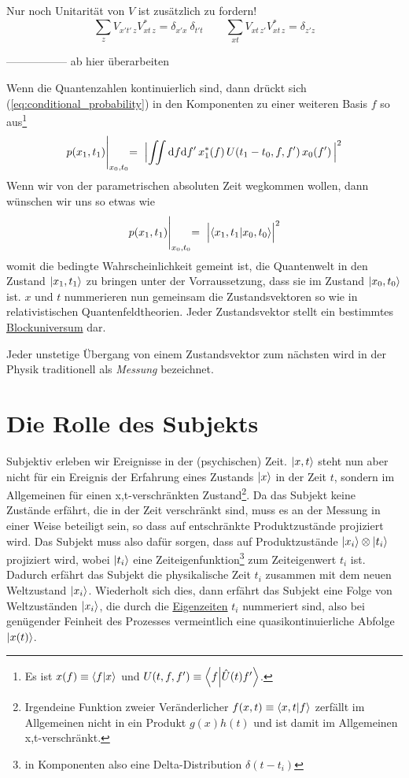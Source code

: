 \documentclass[12pt]{article}
\begin{document}
Nur noch Unitarität von $V$ ist zusätzlich zu fordern!
\begin{equation} 
\sum_{z} V_{x't'\, z} V^*_{xt\, z} = \delta_{x'x}\ \delta_{t't} \quad\quad
\sum_{xt} V_{xt\, z'} V^*_{xt\, z} = \delta_{z'z}
\end{equation}


-----------------
ab hier überarbeiten

Wenn die Quantenzahlen kontinuierlich sind, dann drückt sich (\ref{eq:conditional_probability}) in den Komponenten zu einer weiteren Basis $f$ so aus\footnote{Es ist $x(f) \equiv \bra{f}\ket{x}$ und $U(t,f,f') \equiv \bra{f}\ket{\hat{U}(t)f'}$.}
\begin{equation} 
\label{eq:conditional_probability_components}
p(x_1,t_1) \Biggl|_{x_0,t_0}
=\ \Bigl| \iint \mathrm{d}f\mathrm{d}f'\, x_1^*(f)\, U(t_1-t_0,f,f')\, x_0(f')\, \Bigr|^2
\end{equation}
Wenn wir von der parametrischen absoluten Zeit wegkommen wollen, dann wünschen wir uns so etwas wie
\begin{equation} 
\label{eq:conditional_probability_relat}
p(x_1,t_1)\Biggl|_{x_0,t_0} =\ \Bigl| \bra{x_1,t_1}\ket{x_0,t_0} \Bigr|^2
\end{equation}
womit die bedingte Wahrscheinlichkeit gemeint ist, die Quantenwelt in den Zustand $\ket{x_1,t_1}$ zu bringen unter der Vorraussetzung, dass sie im Zustand $\ket{x_0,t_0}$ ist.  $x$ und $t$ nummerieren nun gemeinsam die Zustandsvektoren so wie in relativistischen Quantenfeldtheorien. Jeder Zustandsvektor stellt ein bestimmtes \href{https://de.wikipedia.org/wiki/Blockuniversum}{Blockuniversum} dar.

Jeder unstetige Übergang von einem Zustandsvektor zum nächsten wird in der Physik traditionell als \emph{Messung} bezeichnet. 

\section{Die Rolle des Subjekts}

Subjektiv erleben wir Ereignisse in der (psychischen) Zeit. $\ket{x,t}$ steht nun aber nicht für ein Ereignis der Erfahrung eines Zustands $\ket{x}$ in der Zeit $t$, sondern im Allgemeinen für einen x,t-verschränkten Zustand\footnote{Irgendeine Funktion zweier Veränderlicher $f(x,t)\equiv\bra{x,t}\ket{f}$ zerfällt im Allgemeinen nicht in ein Produkt $g(x)h(t)$ und ist damit im Allgemeinen x,t-verschränkt.}. Da das Subjekt keine Zustände erfährt, die in der Zeit verschränkt sind, muss es an der Messung in einer Weise beteiligt sein, so dass auf entschränkte Produktzustände projiziert wird. Das Subjekt muss also dafür sorgen, dass auf Produktzustände $\ket{x_i}\otimes\ket{t_i}$ projiziert wird, wobei $\ket{t_i}$ eine Zeiteigenfunktion\footnote{in Komponenten also eine Delta-Distribution $\delta(t-t_i)$} zum Zeiteigenwert $t_i$ ist. Dadurch erfährt das Subjekt die physikalische Zeit $t_i$ zusammen mit dem neuen Weltzustand $\ket{x_i}$. Wiederholt sich dies, dann erfährt das Subjekt eine Folge von Weltzuständen $\ket{x_i}$, die durch die \href{https://de.wikipedia.org/wiki/Zeitdilatation}{Eigenzeiten} $t_i$ nummeriert sind, also bei genügender Feinheit des Prozesses vermeintlich eine quasikontinuierliche Abfolge $\ket{x(t)}$.
\end{document}
